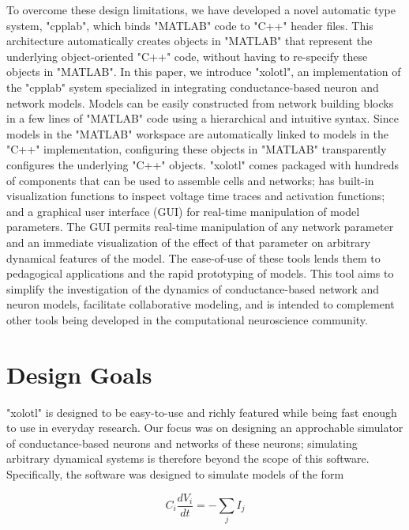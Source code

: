 \documentclass{frontiersSCNS} %
\begin{document}
To overcome these design limitations, we have developed a novel automatic type system, "cpplab", which binds "MATLAB" code to "C++" header files. This architecture automatically creates objects in "MATLAB" that represent the underlying object-oriented "C++" code, without having to re-specify these objects in "MATLAB". In this paper, we introduce "xolotl", an implementation of the "cpplab" system specialized in integrating conductance-based neuron and network models. Models can be easily constructed from network building blocks in a few lines of "MATLAB" code using a hierarchical and intuitive syntax. Since models in the "MATLAB" workspace are automatically linked to models in the "C++" implementation, configuring these objects in "MATLAB" transparently configures the underlying "C++" objects. "xolotl" comes packaged with hundreds of components that can be used to assemble cells and networks;  has built-in visualization functions to inspect voltage time traces and activation functions; and a graphical user interface (GUI) for real-time manipulation of model parameters. The GUI permits real-time manipulation of any network parameter and an immediate visualization of the effect of that parameter on arbitrary dynamical features of the model. The ease-of-use of these tools lends them to pedagogical applications and the rapid prototyping of models. This tool aims to simplify the investigation of the dynamics of conductance-based network and neuron models, facilitate collaborative modeling, and is intended to complement other tools being developed in the computational neuroscience community.

%
%
%
%
%
%

\section{Design Goals}
\label{design}

"xolotl" is designed to be easy-to-use and richly featured while being fast enough to use in everyday research. Our focus was on designing an approchable simulator of conductance-based neurons and networks of these neurons; simulating arbitrary dynamical systems is therefore beyond the scope of this software. Specifically, the software was designed to simulate models of the form 


\begin{equation}
C_{i}\frac{dV_{i}}{dt}=-\sum_{j}I_{j} \label{eq:1}
\end{equation}
\end{document}
